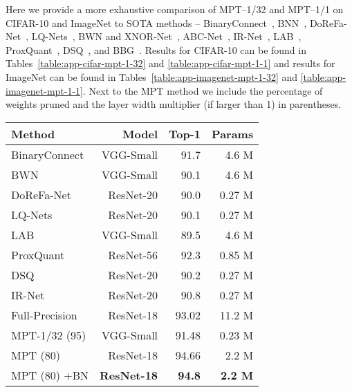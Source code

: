 \documentclass{article} \usepackage{iclr2021_conference,times}
\begin{document}
Here we provide a more exhaustive comparison of MPT--1/32 and MPT--1/1 on CIFAR-10 and ImageNet to SOTA methods -- BinaryConnect~\citep{courbariaux2015binaryconnect}, BNN~\citep{courbariaux2016binarized}, 
DoReFa-Net~\citep{zhou2016dorefa},
LQ-Nets~\citep{zhang2018lq},
BWN and XNOR-Net~\citep{rastegari2016xnornet},
ABC-Net~\citep{lin2017towards},
IR-Net~\citep{qin2020forward},
LAB~\citep{hou2016loss},
ProxQuant~\citep{bai2018proxquant},
DSQ~\citep{gong2019differentiable}, and
BBG~\citep{shen2020balanced}. 
Results for CIFAR-10 can be found in Tables~\ref{table:app-cifar-mpt-1-32} and \ref{table:app-cifar-mpt-1-1} and results for ImageNet can be found in Tables~\ref{table:app-imagenet-mpt-1-32} and \ref{table:app-imagenet-mpt-1-1}. Next to the MPT method we include the percentage of weights pruned and the layer width multiplier (if larger than 1) in parentheses. 

\begin{table*}[!t] 
\centering
\begin{small}
\begin{tabular}{@{}lrrr@{}}\toprule
\textbf{Method} & \textbf{Model} & \textbf{Top-1} & \textbf{Params} \\ \midrule
BinaryConnect & VGG-Small & 91.7 & 4.6 M \\ \hdashline
BWN & VGG-Small & 90.1 & 4.6 M \\ \hdashline
DoReFa-Net & ResNet-20 & 90.0 & 0.27 M \\ \hdashline
LQ-Nets & ResNet-20 & 90.1 & 0.27 M \\ \hdashline
LAB & VGG-Small & 89.5 & 4.6 M \\ \hdashline
ProxQuant & ResNet-56 & 92.3 & 0.85 M \\ \hdashline
DSQ & ResNet-20 & 90.2 & 0.27 M \\ \hdashline
IR-Net & ResNet-20 & 90.8 & 0.27 M \\ \hdashline
Full-Precision & ResNet-18 & 93.02 & 11.2 M \\ \hline
MPT-1/32 (95) & VGG-Small & 91.48 & 0.23 M \\ \hdashline
MPT (80) & ResNet-18 & 94.66 & 2.2 M \\ \hdashline
MPT (80) +BN & \textbf{ResNet-18} & \textbf{94.8} & \textbf{2.2 M} \\ 
\bottomrule
\end{tabular}
\end{small}
\caption{Comparison of MPT-1/32 with Trained Binary (1/32) Networks on CIFAR-10}
\label{table:app-cifar-mpt-1-32}
\end{table*} 
\end{document}
